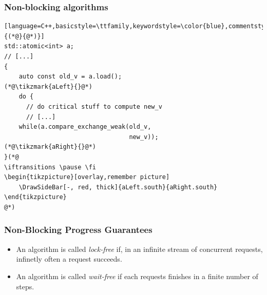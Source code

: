 \documentclass{beamer}
\newcommand{\tikzmark}[2]{%
     \tikz[overlay,remember picture] \node[text=black,
           inner sep=2pt] (#1) {#2};}
\newcommand{\HorizontalShiftForBar}{2.0em,+0.0ex}%
\newcommand{\Stub}{0.0em,-0.6ex}%
\newcommand{\DrawSideBar}[3][]{%
        \coordinate (top left)  at ($(#2)       +(\HorizontalShiftForBar)$);
        \coordinate (start)     at ($(top left) +(\Stub)$);
        \coordinate (top right) at ($(#3)       +(\HorizontalShiftForBar)$);
        \coordinate (end)       at ($(top right)+(\Stub)$);
        \draw [#1] (start) -- (top left) -- (top right) -- (end);
}%
\newif\iftransitions
\begin{document}
\iftransitions

\begin{frame}[fragile]

\frametitle{Non-blocking algorithms}

\begin{lstlisting}[language=C++,basicstyle=\ttfamily,keywordstyle=\color{blue},commentstyle=\color{teal}\itshape,showstringspaces=false,escapeinside={(*@}{@*)}]
std::atomic<int> a;
// [...](*@\iftransitions \pause \fi@*)
{
    auto const old_v = a.load();(*@\iftransitions \pause \fi@*)


      // do critical stuff to compute new_v
      // [...](*@\iftransitions \pause \fi@*)
          a.compare_exchange_weak(old_v,
                                  new_v) ;

}
\end{lstlisting}

\end{frame}

\fi


\begin{frame}[fragile]

\frametitle{Non-blocking algorithms}

\begin{lstlisting}[language=C++,basicstyle=\ttfamily,keywordstyle=\color{blue},commentstyle=\color{teal}\itshape,showstringspaces=false,escapeinside={(*@}{@*)}]
std::atomic<int> a;
// [...]
{
    auto const old_v = a.load();
(*@\tikzmark{aLeft}{}@*)
    do {
      // do critical stuff to compute new_v
      // [...]
    while(a.compare_exchange_weak(old_v,
                                  new_v));
(*@\tikzmark{aRight}{}@*)
}(*@
\iftransitions \pause \fi
\begin{tikzpicture}[overlay,remember picture]
    \DrawSideBar[-, red, thick]{aLeft.south}{aRight.south}
\end{tikzpicture}
@*)\end{lstlisting}

\end{frame}


\begin{frame}[fragile]

\frametitle{Non-Blocking Progress Guarantees}

\begin{itemize}
    \setlength\itemsep{1.5em}
    \item An algorithm is called \emph{lock-free} if, in an infinite stream of concurrent requests, infinetly often a request succeeds.

    \iftransitions \pause \fi

    \item An algorithm is called \emph{wait-free} if each requests finishes in a finite number of steps.
\end{itemize}

\end{frame}
\end{document}
